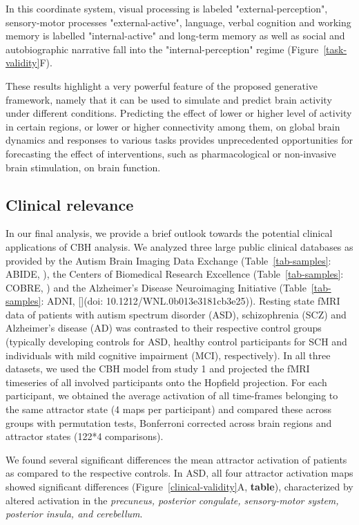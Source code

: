 \documentclass{article}
\begin{document}
In this coordinate system, visual processing is labeled "external-perception", sensory-motor processes "external-active", language, verbal cognition and working memory is labelled "internal-active" and long-term memory as well as social and autobiographic narrative fall into the "internal-perception" regime (Figure~\ref{task-validity}F).

These results highlight a very powerful feature of the proposed generative framework, namely that it can be used to simulate and predict brain activity under different conditions. Predicting the effect of lower or higher level of activity in certain regions, or lower or higher connectivity among them, on global brain dynamics and responses to various tasks provides unprecedented opportunities for forecasting the effect of interventions, such as pharmacological or non-invasive brain stimulation, on brain function.

\subsection{Clinical relevance}\label{Clinical relevance}

In our final analysis, we provide a brief outlook towards the potential clinical applications of CBH analysis. We analyzed three large public clinical databases as provided by the Autism Brain Imaging Data Exchange (Table~\ref{tab-samples}: ABIDE, \href{https://doi.org/10.1038/mp.2013.78}{}), the Centers of Biomedical Research Excellence (Table~\ref{tab-samples}: COBRE, \href{https://doi.org/10.1007/s12021-017-9338-9}{}) and the Alzheimer's Disease Neuroimaging Initiative (Table~\ref{tab-samples}: ADNI, [](doi: 10.1212/WNL.0b013e3181cb3e25)).
Resting state fMRI data of patients with autism spectrum disorder (ASD), schizophrenia (SCZ) and Alzheimer's disease (AD) was contrasted to their respective control groups (typically developing controls for ASD, healthy control participants for SCH and individuals with mild cognitive impairment (MCI), respectively).
In all three datasets, we used the CBH model from study 1 and projected the fMRI timeseries of all involved participants onto the Hopfield projection. For each participant, we obtained the average activation of all time-frames belonging to the same attractor state (4 maps per participant) and compared these across groups with permutation tests, Bonferroni corrected across brain regions and attractor states (122*4 comparisons).

We found several significant differences the mean attractor activation of patients as compared to the respective controls. In ASD, all four attractor activation maps showed significant differences (Figure~\ref{clinical-validity}A, \textbf{table}), characterized by altered activation in the \textit{precuneus, posterior congulate, sensory-motor system, posterior insula, and cerebellum}.
\end{document}
